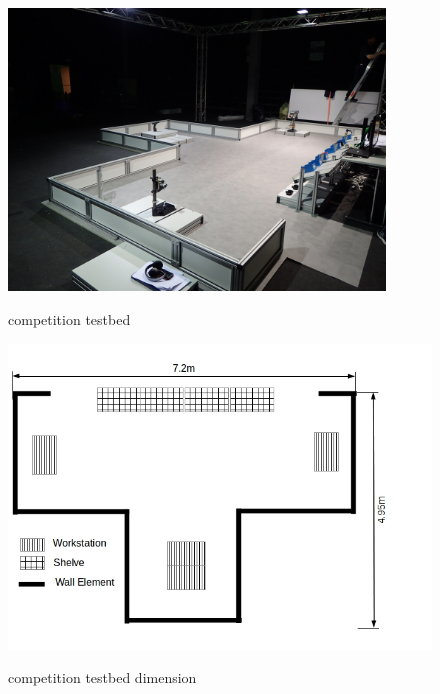 \begin{figure}[htb]
 \begin{center}
 \includegraphics[width=10cm]{./fig/testbed/roaw_arena_lisbon.JPG} 
 \caption{ competition testbed}
 \label{fig:RoawTestBed2014} 
 \includegraphics[width=12cm]{./fig/testbed/roaw_arena_lisbonDimension.jpg} 
 \end{center}
 \caption{ competition testbed dimension}
  \label{fig:RoawTestBed2013Dimension} 
\end{figure}




